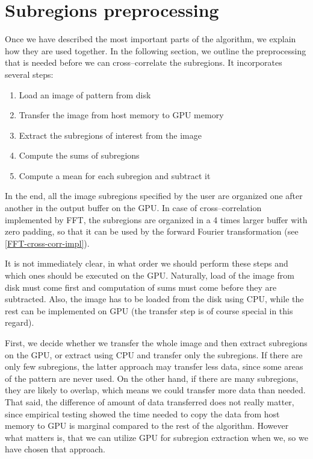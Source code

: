 \section{Subregions preprocessing}
\label{preprocessing}
Once we have described the most important parts of the algorithm, we explain how they are used together. In the following section, we outline the preprocessing that is needed before we can cross--correlate the subregions. It incorporates several steps:
\begin{enumerate}
	\item Load an image of pattern from disk
	\item Transfer the image from host memory to GPU memory
	\item Extract the subregions of interest from the image
	\item Compute the sums of subregions
	\item Compute a mean for each subregion and subtract it
\end{enumerate}
In the end, all the image subregions specified by the user are organized one after another in the output buffer on the GPU. In case of cross--correlation implemented by FFT, the subregions are organized in a 4 times larger buffer with zero padding, so that it can be used by the forward Fourier transformation (see \cref{FFT-cross-corr-impl}).

It is not immediately clear, in what order we should perform these steps and which ones should be executed on the GPU. Naturally, load of the image from disk must come first and computation of sums must come before they are subtracted. Also, the image has to be loaded from the disk using CPU, while the rest can be implemented on GPU (the transfer step is of course special in this regard).

First, we decide whether we transfer the whole image and then extract subregions on the GPU, or extract using CPU and transfer only the subregions. If there are only few subregions, the latter approach may transfer less data, since some areas of the pattern are never used. On the other hand, if there are many subregions, they are likely to overlap, which means we could transfer more data than needed. That said, the difference of amount of data transferred does not really matter, since empirical testing showed the time needed to copy the data from host memory to GPU is marginal compared to the rest of the algorithm. However what matters is, that we can utilize GPU for subregion extraction when we, so we have chosen that approach.

